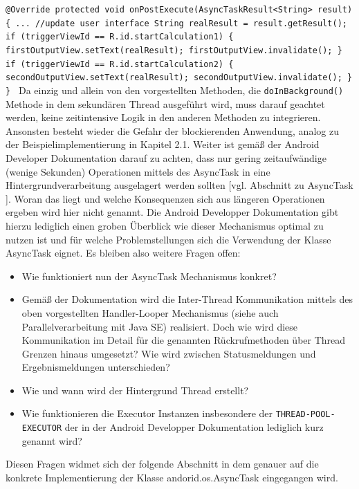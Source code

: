 \documentclass[12pt,oneside,a4paper,bibtotoc,liststotoc]{scrreprt}
\begin{document}
\newline
\texttt{@Override\newline
   protected void onPostExecute(AsyncTaskResult<String> result) \{\newline
...\newline
           //update user interface\newline
           String realResult = result.getResult();\newline
\newline
           if (triggerViewId == R.id.startCalculation1) \{\newline
               firstOutputView.setText(realResult);\newline
               firstOutputView.invalidate();\newline
           \}\newline
           if (triggerViewId == R.id.startCalculation2) \{\newline
               secondOutputView.setText(realResult);\newline
               secondOutputView.invalidate();\newline
           \}\newline
       \}\newline
}
Da einzig und allein von den vorgestellten Methoden, die \texttt{doInBackground()} Methode in dem sekundären Thread ausgeführt wird, muss darauf geachtet werden, keine zeitintensive Logik in den anderen Methoden zu integrieren. Ansonsten besteht wieder die Gefahr der blockierenden Anwendung, analog zu der Beispielimplementierung in Kapitel 2.1. Weiter ist gemäß der Android Developer Dokumentation darauf zu achten, dass nur gering zeitaufwändige (wenige Sekunden) Operationen mittels des AsyncTask in eine Hintergrundverarbeitung ausgelagert werden sollten [vgl. Abschnitt zu AsyncTask \citet{androidDevDocu}]. Woran das liegt und welche Konsequenzen sich aus längeren Operationen ergeben wird hier nicht genannt. Die Android Developper Dokumentation gibt hierzu lediglich einen groben Überblick wie dieser Mechanismus optimal zu nutzen ist und für welche Problemstellungen sich die Verwendung der Klasse AsyncTask eignet. Es bleiben also weitere Fragen offen:
\begin{itemize}
\item Wie funktioniert nun der AsyncTask Mechanismus konkret?
\item Gemäß der Dokumentation wird die Inter-Thread Kommunikation mittels des oben vorgestellten Handler-Looper Mechanismus (siehe auch Parallelverarbeitung mit Java SE) realisiert. Doch wie wird diese Kommunikation im Detail für die genannten Rückrufmethoden über Thread Grenzen hinaus umgesetzt? Wie wird zwischen Statusmeldungen und Ergebnismeldungen unterschieden?
\item Wie und wann wird der Hintergrund Thread erstellt?
\item Wie funktionieren die Executor Instanzen insbesondere der \texttt{THREAD-POOL-EXECUTOR} der in der Android Developper Dokumentation lediglich kurz genannt wird?
\end{itemize}
Diesen Fragen widmet sich der folgende Abschnitt in dem genauer auf die konkrete Implementierung der Klasse andorid.os.AsyncTask eingegangen wird.
\end{document}
